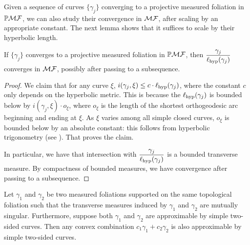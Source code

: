 \documentclass[12pt, reqno]{amsart}
\begin{document}
Given a sequence of curves $\{\gamma_j\}$ converging to a projective measured foliation in $\mathbb{P}\mathcal{MF}$, we can also study their convergence in $\mathcal{MF}$, after scaling by an appropriate constant.
The next lemma shows that it suffices to scale by their hyperbolic length.
\begin{lemma}
  \label{lem:scaling-lemma}
  If $\{\gamma_j\}$ converges to a projective measured foliation in $\mathbb{P}\mathcal{MF}$, then $\displaystyle \frac{\gamma_j}{\ell_{\mathrm{hyp}}(\gamma_j)}$ converges in $\mathcal{MF}$, possibly after passing to a subsequence.
\end{lemma}
\begin{proof}
  We claim that for any curve $\xi$, $i(\gamma_j, \xi) \leq c \cdot \ell_{\mathrm{hyp}}(\gamma_j)$, where the constant $c$ only depends on the hyperbolic metric.
  This is because the $\ell_{\mathrm{hyp}}(\gamma_j)$ is bounded below by $i(\gamma_j, \xi) \cdot o_\xi$, where $o_\xi$ is the length of the shortest orthogeodesic arc beginning and ending at $\xi$.
  As $\xi$ varies among all simple closed curves, $o_\xi$ is bounded below by an absolute constant: this follows from hyperbolic trigonometry (see \cite{thurston1979geometry}).
  That proves the claim.

  In particular, we have that intersection with $\displaystyle \frac{\gamma_j}{\ell_{\mathrm{hyp}}(\gamma_j)}$ is a bounded transverse measure.
  By compactness of bounded measures, we have convergence after passing to a subsequence.
\end{proof}

\begin{lemma}
  \label{lem:convex-combinations}
  Let $\gamma_1$ and $\gamma_2$ be two measured foliations supported on the same topological foliation such that the transverse measures induced by $\gamma_1$ and $\gamma_2$ are mutually singular.
  Furthermore, suppose both $\gamma_1$ and $\gamma_2$ are approximable by simple two-sided curves.
  Then any convex combination $c_1 \gamma_1 + c_2\gamma_2$ is also approximable by simple two-sided curves.
\end{lemma}
\end{document}

